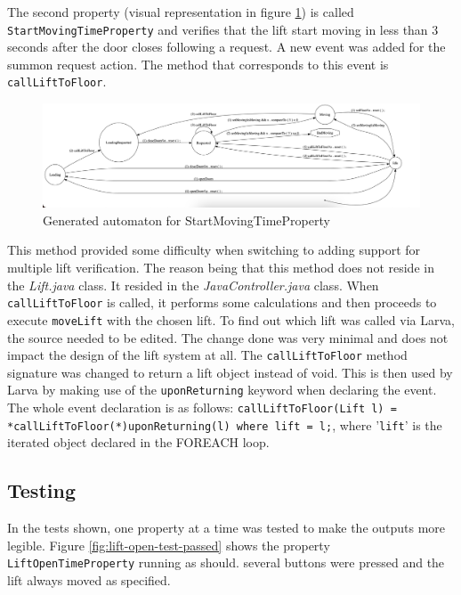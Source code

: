 \documentclass[a4paper, 12pt]{article}
\begin{document}
The second property (visual representation in figure \ref{fig:generated-automaton-StartMovingTimeProperty}) is called \texttt{StartMovingTimeProperty} and verifies that the lift start moving in less than 3 seconds after the door closes following a request. A new event was added for the summon request action. The method that corresponds to this event is \texttt{callLiftToFloor}. \\

\begin{figure}[h]
   \centering
   \includegraphics[width=\textwidth,height=\textheight,keepaspectratio]{images/generated-automaton-StartMovingTimeProperty} %
   \caption{Generated automaton for StartMovingTimeProperty}
   \label{fig:generated-automaton-StartMovingTimeProperty}
\end{figure}

This method provided some difficulty when switching to adding support for multiple lift verification. The reason being that this method does not reside in the \textit{Lift.java} class. It resided in the \textit{JavaController.java} class. When \texttt{callLiftToFloor} is called, it performs some calculations and then proceeds to execute \texttt{moveLift} with the chosen lift. To find out which lift was called via Larva, the source needed to be edited. The change done was very minimal and does not impact the design of the lift system at all. The \texttt{callLiftToFloor} method signature was changed to return a lift object instead of void. This is then used by Larva by making use of the \texttt{uponReturning} keyword when declaring the event. The whole event declaration is as follows: \newline\texttt{callLiftToFloor(Lift l) = {*callLiftToFloor(*)uponReturning(l)} where {lift = l;}}, where '\texttt{lift}' is the iterated object declared in the FOREACH loop. 

\subsection{Testing}
In the tests shown, one property at a time was tested to make the outputs more legible. Figure \ref{fig:lift-open-test-passed} shows the property \texttt{LiftOpenTimeProperty} running as should. several buttons were pressed and the lift always moved as specified. \\
\end{document}
